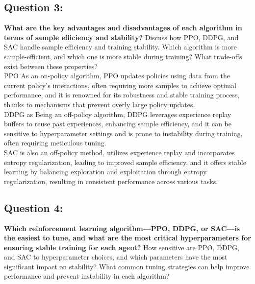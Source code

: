 \documentclass[12pt]{article}
\begin{document}
{{{\subsection{Question 3:}
\textbf{What are the key advantages and disadvantages of each algorithm in terms of sample efficiency and stability?}
\newline
Discuss how PPO, DDPG, and SAC handle sample efficiency and training stability. Which algorithm is more sample-efficient, and which one is more stable during training? What trade-offs exist between these properties?\\
PPO As an on-policy algorithm, PPO updates policies using data from the current policy's interactions, often requiring more samples to achieve optimal performance, and it is renowned for its robustness and stable training process, thanks to mechanisms that prevent overly large policy updates.\\
DDPG as Being an off-policy algorithm, DDPG leverages experience replay buffers to reuse past experiences, enhancing sample efficiency, and it can be sensitive to hyperparameter settings and is prone to instability during training, often requiring meticulous tuning. \\
SAC is also an off-policy method, utilizes experience replay and incorporates entropy regularization, leading to improved sample efficiency, and it offers stable learning by balancing exploration and exploitation through entropy regularization, resulting in consistent performance across various tasks.

\subsection{Question 4:}
\textbf{Which reinforcement learning algorithm—PPO, DDPG, or SAC—is the easiest to tune, and what are the most critical hyperparameters for ensuring stable training for each agent?}
\newline
How sensitive are PPO, DDPG, and SAC to hyperparameter choices, and which parameters have the most significant impact on stability?
What common tuning strategies can help improve performance and prevent instability in each algorithm?\\

}}}
\end{document}
